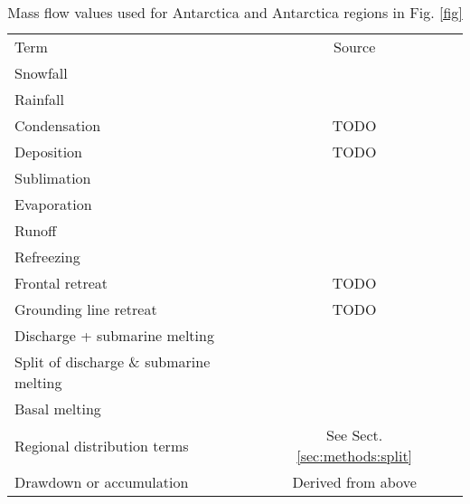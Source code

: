 \documentclass[jog]{igs}
\begin{document}
\begin{table*}
\caption{Mass flow values used for Antarctica and Antarctica regions in Fig. \ref{fig}}
\label{tab:aq}
\begin{tabular}{@{}lcc}\hline
  Term & Source\\
  Snowfall & \citet{fettweis_2020}\\
  Rainfall & \citet{fettweis_2020}\\
  Condensation & TODO\\
  Deposition & TODO\\
  Sublimation & \citet{fettweis_2020}\\
  Evaporation & \citet{fettweis_2020}\\
  Runoff & \citet{fettweis_2020}\\
  Refreezing & \citet{fettweis_2020}\\
  Frontal retreat & TODO\\
  Grounding line retreat & TODO\\
  Discharge + submarine melting & \citet{davison_2023}\\
  Split of discharge \& submarine melting & \citet{davison_2023}\\
  Basal melting & \citet{pattyn_2010}\\
  Regional distribution terms & See Sect. \ref{sec:methods:split}\\
  Drawdown or accumulation & Derived from above
\end{tabular}
\end{table*}
\end{document}
